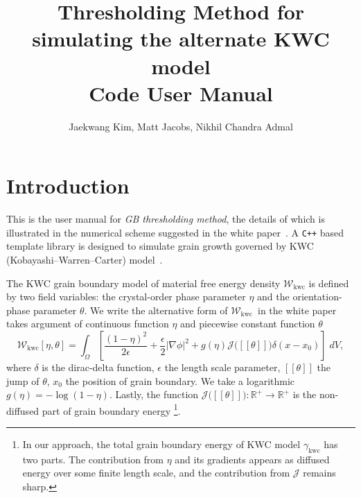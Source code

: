 \documentclass[11pt]{article}
\begin{document}
\title{Thresholding Method for simulating the alternate KWC model\\ Code User Manual}
\author{Jaekwang Kim, Matt Jacobs, Nikhil Chandra Admal} 

\maketitle 
\sectionfont{\fontsize{14}{14}\selectfont}

\normalsize

\section{Introduction}

This is the user manual for \textit{GB thresholding method}, 
the details of which is illustrated in the numerical scheme suggested in the white paper~\cite{Jkim:2020}.
A \texttt{C++} based template library is designed to simulate grain growth governed by   
KWC (Kobayashi--Warren--Carter) model~\cite{KWC:1998,KWC:2001,KWC:2003}.

The KWC grain boundary model of material free energy density $\mathcal{W}_{\mathrm{kwc}}$  
is defined by two field variables: the crystal-order phase parameter $\eta$ 
and the orientation-phase parameter $\theta$. 
We write the alternative form of $\mathcal{W}_{\mathrm{kwc}}$~in the white paper~\cite{Jkim:2020}
takes argument of continuous function $\eta$ and piecewise constant function $\theta$
\begin{equation}
\mathcal{W}_{\mathrm{kwc}}[\eta,\theta] = \int_{\Omega}
\left[ \frac{(1-\eta)^2}{2 \epsilon} + \frac{\epsilon}{2}|\nabla \phi|^2
+g(\eta) \mathcal{J}\big( [\![\theta ]\!]\big) \delta(x-x_0) 
\right]\; dV,
\label{eqn:alternateKWC}
\end{equation}
where $\delta$ is the dirac-delta function, 
$\epsilon$ the length scale parameter,
$[\![\theta]\!]$ the jump of $\theta$, 
$x_0$ the position of grain boundary.
We take a logarithmic $g(\eta)=-\log{(1-\eta)}$. 
Lastly, the function $\mathcal{J}\big( [\![\theta ]\!]\big): \mathbb{R}^{+} \to \mathbb{R}^{+}$
is the non-diffused part of grain boundary energy
\footnote{In our approach, the total grain boundary energy 
of KWC model $\gamma_{\mathrm{kwc}}$ has two parts. 
The contribution from $\eta$ and its gradients appears as diffused 
energy over some finite length scale, and the contribution from $\mathcal{J}$
remains sharp.
}.
\end{document}
